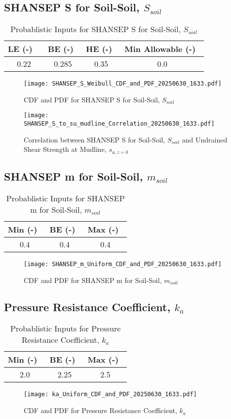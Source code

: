 \documentclass{article}
\begin{document}
\subsection*{SHANSEP S for Soil-Soil, $S_{soil}$}
\begin{table}[h!]
\centering
\caption{Probablistic Inputs for SHANSEP S for Soil-Soil, $S_{soil}$}
\begin{tabular}{|c|c|c|c|}
\hline
LE (-) \ & BE (-)\ & HE (-)\ & Min Allowable (-)\ \\
\hline
0.22 & 0.285 & 0.35 & 0.0 \\
\hline
\end{tabular}
\end{table}
\begin{figure}[h!]
\centering
\texttt{[image: SHANSEP\_S\_Weibull\_CDF\_and\_PDF\_20250630\_1633.pdf]}
\caption{CDF and PDF for SHANSEP S for Soil-Soil, $S_{soil}$}
\end{figure}
\begin{figure}[h!]
\centering
\texttt{[image: SHANSEP\_S\_to\_su\_mudline\_Correlation\_20250630\_1633.pdf]}
\caption{Correlation between SHANSEP S for Soil-Soil, $S_{soil}$ and Undrained Shear Strength at Mudline, $s_{{u,z=0}}$}
\end{figure}
\clearpage
\subsection*{SHANSEP m for Soil-Soil, $m_{soil}$}
\begin{table}[h!]
\centering
\caption{Probablistic Inputs for SHANSEP m for Soil-Soil, $m_{soil}$}
\begin{tabular}{|c|c|c|}
\hline
Min (-)\ & BE (-)\ & Max (-)\ \\
\hline
0.4 & 0.4 & 0.4 \\
\hline
\end{tabular}
\end{table}
\begin{figure}[h!]
\centering
\texttt{[image: SHANSEP\_m\_Uniform\_CDF\_and\_PDF\_20250630\_1633.pdf]}
\caption{CDF and PDF for SHANSEP m for Soil-Soil, $m_{soil}$}
\end{figure}
\clearpage
\subsection*{Pressure Resistance Coefficient, $k_a$}
\begin{table}[h!]
\centering
\caption{Probablistic Inputs for Pressure Resistance Coefficient, $k_a$}
\begin{tabular}{|c|c|c|}
\hline
Min (-)\ & BE (-)\ & Max (-)\ \\
\hline
2.0 & 2.25 & 2.5 \\
\hline
\end{tabular}
\end{table}
\begin{figure}[h!]
\centering
\texttt{[image: ka\_Uniform\_CDF\_and\_PDF\_20250630\_1633.pdf]}
\caption{CDF and PDF for Pressure Resistance Coefficient, $k_a$}
\end{figure}
\clearpage
\end{document}

